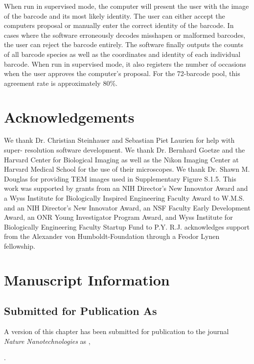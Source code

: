 When run in supervised mode, the computer will present the user with the image of the barcode and its most likely identity. The user can either accept the computers proposal or manually enter the correct identity of the barcode. In cases where the software erroneously decodes misshapen or malformed barcodes, the user can reject the barcode entirely. The software finally outputs the counts of all barcode species as well as the coordinates and identity of each individual barcode. When run in supervised mode, it also registers the number of occasions when the user approves the computer’s proposal. For the 72-barcode pool, this agreement rate is approximately 80\%.

\section{Acknowledgements}
We thank Dr. Christian Steinhauer and Sebastian Piet Laurien for help with super- 
resolution software development. We thank Dr. Bernhard Goetze and the Harvard Center 
for Biological Imaging as well as the Nikon Imaging Center at Harvard Medical School 
for the use of their microscopes. We thank Dr. Shawn M. Douglas for providing TEM 
images used in Supplementary Figure S.1.5. This work was supported by grants from an NIH Director’s New 
Innovator Award and a Wyss Institute for Biologically Inspired Engineering Faculty 
Award to W.M.S. and an NIH Director’s New Innovator Award, an NSF Faculty Early 
Development Award, an ONR Young Investigator Program Award, and Wyss Institute 
for Biologically Engineering Faculty Startup Fund to P.Y. R.J. acknowledges support 
from the Alexander von Humboldt-Foundation through a Feodor Lynen fellowship.





\section{Manuscript Information}
\subsection{Submitted for Publication As}
A version of this chapter has been submitted for publication to the journal \textit{Nature Nanotechnologies}  as \citep{lin_sub-micrometer_2011},

.

